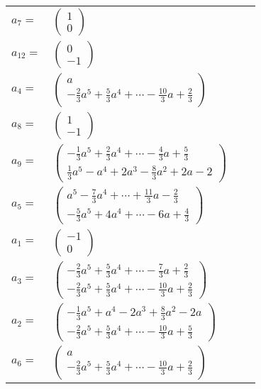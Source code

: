 \documentclass[1p]{elsarticle_modified}
\theoremstyle{definition}
\begin{document}
\begin{tabular}{m{7pt} m{180pt} m{7pt} m{180pt} }
\flushright $a_{7}=$&$\begin{pmatrix}1\\0\end{pmatrix}$ \\
\flushright $a_{12}=$&$\begin{pmatrix}0\\-1\end{pmatrix}$ \\
\flushright $a_{4}=$&$\begin{pmatrix}a\\-\frac{2}{3} a^5+\frac{5}{3} a^4+\cdots-\frac{10}{3} a+\frac{2}{3}\end{pmatrix}$ \\
\flushright $a_{8}=$&$\begin{pmatrix}1\\-1\end{pmatrix}$ \\
\flushright $a_{9}=$&$\begin{pmatrix}-\frac{1}{3} a^5+\frac{2}{3} a^4+\cdots-\frac{4}{3} a+\frac{5}{3}\\\frac{1}{3} a^5- a^4+2 a^3-\frac{8}{3} a^2+2 a-2\end{pmatrix}$ \\
\flushright $a_{5}=$&$\begin{pmatrix}a^5-\frac{7}{3} a^4+\cdots+\frac{11}{3} a-\frac{2}{3}\\-\frac{5}{3} a^5+4 a^4+\cdots-6 a+\frac{4}{3}\end{pmatrix}$ \\
\flushright $a_{1}=$&$\begin{pmatrix}-1\\0\end{pmatrix}$ \\
\flushright $a_{3}=$&$\begin{pmatrix}-\frac{2}{3} a^5+\frac{5}{3} a^4+\cdots-\frac{7}{3} a+\frac{2}{3}\\-\frac{2}{3} a^5+\frac{5}{3} a^4+\cdots-\frac{10}{3} a+\frac{2}{3}\end{pmatrix}$ \\
\flushright $a_{2}=$&$\begin{pmatrix}-\frac{1}{3} a^5+a^4-2 a^3+\frac{8}{3} a^2-2 a\\-\frac{2}{3} a^5+\frac{5}{3} a^4+\cdots-\frac{10}{3} a+\frac{5}{3}\end{pmatrix}$ \\
\flushright $a_{6}=$&$\begin{pmatrix}a\\-\frac{2}{3} a^5+\frac{5}{3} a^4+\cdots-\frac{10}{3} a+\frac{2}{3}\end{pmatrix}$ \\

\end{tabular}
\end{document}

